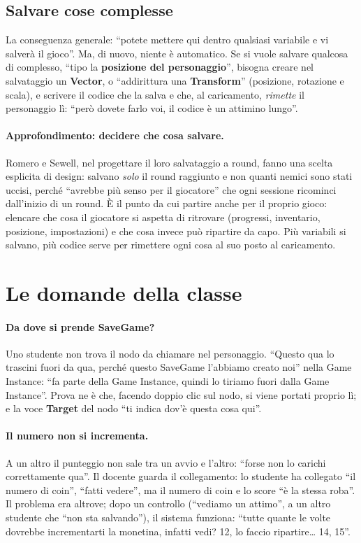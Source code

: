 \subsection{Salvare cose complesse}

La conseguenza generale: ``potete mettere qui dentro qualsiasi variabile e vi
salverà il gioco''. Ma, di nuovo, niente è automatico. Se si vuole salvare
qualcosa di complesso, ``tipo la \textbf{posizione del personaggio}'', bisogna
creare nel salvataggio un \textbf{Vector}, o ``addirittura una
\textbf{Transform}'' (posizione, rotazione e scala), e scrivere il codice che la
salva e che, al caricamento, \emph{rimette} il personaggio lì: ``però dovete
farlo voi, il codice è un attimino lungo''.

\paragraph{Approfondimento: decidere che cosa salvare.} Romero e Sewell, nel
progettare il loro salvataggio a round, fanno una scelta esplicita di design:
salvano \emph{solo} il round raggiunto e non quanti nemici sono stati uccisi,
perché ``avrebbe più senso per il giocatore'' che ogni sessione ricominci
dall'inizio di un round. È il punto da cui partire anche per il proprio
gioco: elencare che cosa il giocatore si aspetta di ritrovare (progressi,
inventario, posizione, impostazioni) e che cosa invece può ripartire da capo.
Più variabili si salvano, più codice serve per rimettere ogni cosa al suo posto
al caricamento.

\section{Le domande della classe}
\label{gd16:sec:domande}

\paragraph{Da dove si prende SaveGame?} Uno studente non trova il nodo da
chiamare nel personaggio. ``Questo qua lo trascini fuori da qua, perché questo
SaveGame l'abbiamo creato noi'' nella Game Instance: ``fa parte della Game
Instance, quindi lo tiriamo fuori dalla Game Instance''. Prova ne è che, facendo
doppio clic sul nodo, si viene portati proprio lì; e la voce \textbf{Target} del
nodo ``ti indica dov'è questa cosa qui''.

\paragraph{Il numero non si incrementa.} A un altro il punteggio non sale tra
un avvio e l'altro: ``forse non lo carichi correttamente qua''. Il docente
guarda il collegamento: lo studente ha collegato ``il numero di coin'', ``fatti
vedere'', ma il numero di coin e lo score ``è la stessa roba''. Il problema era
altrove; dopo un controllo (``vediamo un attimo'', a un altro studente che ``non
sta salvando''), il sistema funziona: ``tutte quante le volte dovrebbe
incrementarti la monetina, infatti vedi? 12, lo faccio ripartire\dots{} 14, 15''.

